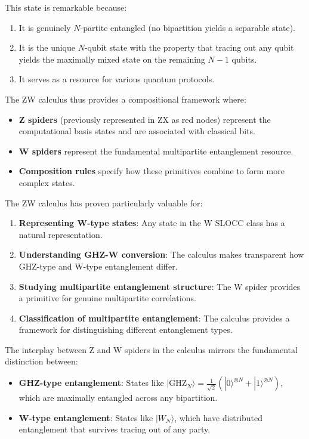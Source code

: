 \documentclass[%
 amsmath,amssymb,
 aps,
rmp,
]{revtex4-2}
\begin{document}
This state is remarkable because:
\begin{enumerate}
	\item It is genuinely $N$-partite entangled (no bipartition yields a separable state).
	\item It is the unique $N$-qubit state with the property that tracing out any qubit yields the maximally mixed state on the remaining $N-1$ qubits.
	\item It serves as a resource for various quantum protocols.
\end{enumerate}

The ZW calculus thus provides a compositional framework where:
\begin{itemize}
	\item \textbf{Z spiders} (previously represented in ZX as red nodes) represent the computational basis states and are associated with classical bits.
	\item \textbf{W spiders} represent the fundamental multipartite entanglement resource.
	\item \textbf{Composition rules} specify how these primitives combine to form more complex states.
\end{itemize}

The ZW calculus has proven particularly valuable for:
\begin{enumerate}
	\item \textbf{Representing W-type states}: Any state in the W SLOCC class has a natural representation.
	\item \textbf{Understanding GHZ-W conversion}: The calculus makes transparent how GHZ-type and W-type entanglement differ.
	\item \textbf{Studying multipartite entanglement structure}: The W spider provides a primitive for genuine multipartite correlations.
	\item \textbf{Classification of multipartite entanglement}: The calculus provides a framework for distinguishing different entanglement types.
\end{enumerate}

The interplay between Z and W spiders in the calculus mirrors the fundamental distinction between:
\begin{itemize}
	\item \textbf{GHZ-type entanglement}: States like $|\text{GHZ}_N\rangle = \frac{1}{\sqrt{2}}(|0\rangle^{\otimes N} + |1\rangle^{\otimes N})$, which are maximally entangled across any bipartition.
	\item \textbf{W-type entanglement}: States like $|W_N\rangle$, which have distributed entanglement that survives tracing out of any party.
\end{itemize}
\end{document}
